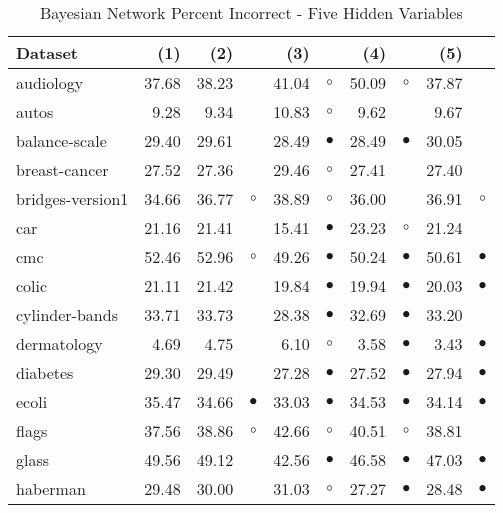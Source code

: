\newpage
{\centering \footnotesize \begin{longtable}{lrr@{\hspace{0.1cm}}cr@{\hspace{0.1cm}}cr@{\hspace{0.1cm}}cr@{\hspace{0.1cm}}c}
\caption{\label{bnpi5}Bayesian Network Percent Incorrect - Five Hidden Variables}
\\
\hline
Dataset & (1)& (2) & & (3) & & (4) & & (5) & \\
\hline
audiology & 37.68 & 38.23 &           & 41.04 &   $\circ$ & 50.09 &   $\circ$ & 37.87 &          \\
autos &  9.28 &  9.34 &           & 10.83 &   $\circ$ &  9.62 &           &  9.67 &          \\
balance-scale & 29.40 & 29.61 &           & 28.49 & $\bullet$ & 28.49 & $\bullet$ & 30.05 &          \\
breast-cancer & 27.52 & 27.36 &           & 29.46 &   $\circ$ & 27.41 &           & 27.40 &          \\
bridges-version1 & 34.66 & 36.77 &   $\circ$ & 38.89 &   $\circ$ & 36.00 &           & 36.91 &   $\circ$\\
car & 21.16 & 21.41 &           & 15.41 & $\bullet$ & 23.23 &   $\circ$ & 21.24 &          \\
cmc & 52.46 & 52.96 &   $\circ$ & 49.26 & $\bullet$ & 50.24 & $\bullet$ & 50.61 & $\bullet$\\
colic & 21.11 & 21.42 &           & 19.84 & $\bullet$ & 19.94 & $\bullet$ & 20.03 & $\bullet$\\
cylinder-bands & 33.71 & 33.73 &           & 28.38 & $\bullet$ & 32.69 & $\bullet$ & 33.20 &          \\
dermatology &  4.69 &  4.75 &           &  6.10 &   $\circ$ &  3.58 & $\bullet$ &  3.43 & $\bullet$\\
diabetes & 29.30 & 29.49 &           & 27.28 & $\bullet$ & 27.52 & $\bullet$ & 27.94 & $\bullet$\\
ecoli & 35.47 & 34.66 & $\bullet$ & 33.03 & $\bullet$ & 34.53 & $\bullet$ & 34.14 & $\bullet$\\
flags & 37.56 & 38.86 &   $\circ$ & 42.66 &   $\circ$ & 40.51 &   $\circ$ & 38.81 &          \\
glass & 49.56 & 49.12 &           & 42.56 & $\bullet$ & 46.58 & $\bullet$ & 47.03 & $\bullet$\\
haberman & 29.48 & 30.00 &           & 31.03 &   $\circ$ & 27.27 & $\bullet$ & 28.48 & $\bullet$\\

\end{longtable}}
